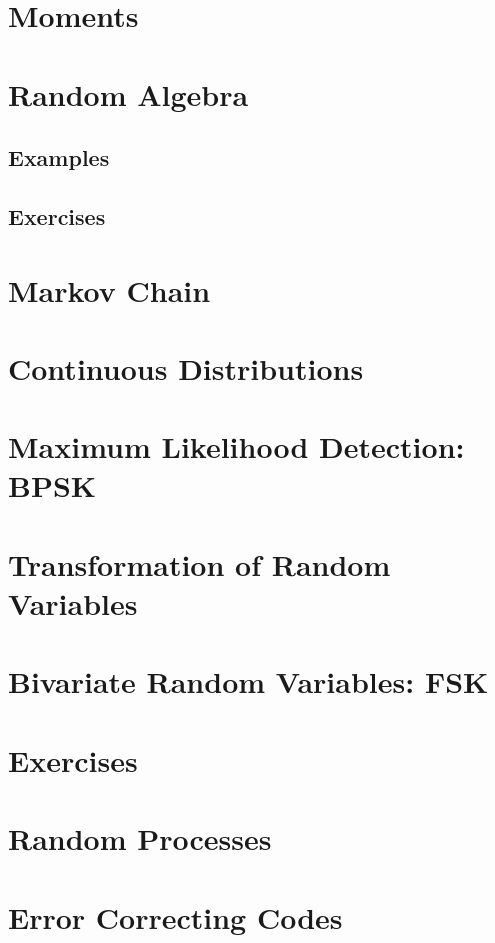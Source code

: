 \documentclass[journal,a5paper]{IEEEtran}
\begin{document}
\section{Moments}

\section{Random Algebra}
\subsection{Examples}

\subsection{Exercises}

\section{Markov Chain}

\section{Continuous Distributions}

\section{Maximum Likelihood Detection: BPSK}

\section{Transformation of Random Variables}

\section{Bivariate Random Variables: FSK}

\section{Exercises}

\section{Random Processes}

\section{Error Correcting Codes}

\end{document}
